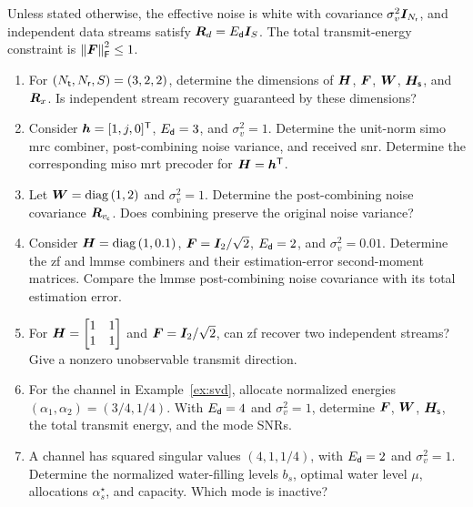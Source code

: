Unless stated otherwise, the effective noise is white with
covariance $\sigma_v^2\bm{I}_{N_{\mathsf{r}}}$, and independent
data streams satisfy $\bm{R}_d=E_{\mathsf{d}}\bm{I}_{S}$.
The total transmit-energy constraint is
$\left\|\bm{F}\right\|_{\mathsf{F}}^2\leq1$.

\begin{enumerate}[label=\textbf{E\arabic*.}]
	
	\item For $(N_{\mathsf{t}},N_{\mathsf{r}},S)=(3,2,2)$, determine the
	dimensions of $\bm{H}$, $\bm{F}$, $\bm{W}$,
	$\bm{H}_{\mathsf{s}}$, and $\bm{R}_x$. Is independent stream
	recovery guaranteed by these dimensions?
	
	\item Consider $\bm{h}=[1,j,0]^{\mathsf T}$,
	$E_{\mathsf{d}}=3$, and $\sigma_v^2=1$.
	Determine the unit-norm \ac{simo} \ac{mrc}
	combiner, post-combining noise variance, and
	received \ac{snr}.
	Determine the corresponding \ac{miso} \ac{mrt}
	precoder for $\bm{H}={\bm{h}}^{\mathsf{T}}$.
	
	\item Let $\bm{W}=\operatorname{diag}\left(1,2\right)$ and $\sigma_v^2=1$.
	Determine the post-combining noise covariance
	$\bm{R}_{v_{\mathsf c}}$.
	Does combining preserve the original noise variance?
	
	\item Consider
	$\bm{H}=\operatorname{diag}\left(1,0.1\right)$,
	$\bm{F}=\bm{I}_2/\sqrt{2}$,
	$E_{\mathsf{d}}=2$, and $\sigma_v^2=0.01$.
	Determine the \ac{zf} and \ac{lmmse} combiners
	and their estimation-error second-moment matrices.
	Compare the \ac{lmmse} post-combining noise covariance
	with its total estimation error.
	
	\item For
	$\bm{H}=\begin{bmatrix}1&1\\1&1\end{bmatrix}$
	and $\bm{F}=\bm{I}_2/\sqrt{2}$,
	can \ac{zf} recover two independent streams?
	Give a nonzero unobservable transmit direction.
	
	\item For the channel in Example~\ref{ex:svd},
	allocate normalized energies
	$(\alpha_1,\alpha_2)=(3/4,1/4)$.
	With $E_{\mathsf{d}}=4$ and $\sigma_v^2=1$,
	determine $\bm{F}$, $\bm{W}$, $\bm{H}_{\mathsf{s}}$,
	the total transmit energy, and the mode SNRs.
	
	\item A channel has squared singular values
	$(4,1,1/4)$, with $E_{\mathsf{d}}=2$ and $\sigma_v^2=1$.
	Determine the normalized water-filling levels $b_s$,
	optimal water level $\mu$, allocations
	$\alpha_s^\star$, and capacity.
	Which mode is inactive?
	

\end{enumerate}
